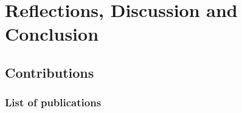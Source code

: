 








\chapter{Reflections, Discussion and Conclusion}
\label{cha:conclusion}

\section{Contributions}

\subsection{List of publications}

